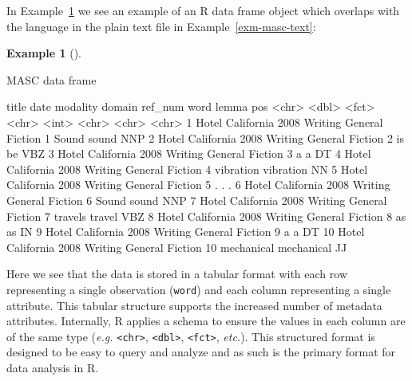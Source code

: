 \documentclass[
  letterpaper,
]{latex/krantz}
\newenvironment{Shaded}{\begin{snugshade}}{\end{snugshade}}
\newcommand{\KeywordTok}[1]{\textcolor[rgb]{0.00,0.00,0.00}{#1}}
\newcommand{\NormalTok}[1]{\textcolor[rgb]{0.00,0.00,0.00}{#1}}
\theoremstyle{definition}
\newtheorem{example}{Example}[chapter]
\theoremstyle{remark}
\begin{document}
In Example~\ref{exm-masc-df} we see an example of an R data frame object
which overlaps with the language in the plain text file in
Example~\ref{exm-masc-text}:

\begin{example}[]\protect\hypertarget{exm-masc-df}{}\label{exm-masc-df}

MASC data frame

\begin{Shaded}
\begin{Highlighting}[]
\NormalTok{   title             date modality domain          ref\_num word       lemma      pos}
\NormalTok{   \textless{}}\KeywordTok{chr}\NormalTok{\textgreater{}            \textless{}}\KeywordTok{dbl}\NormalTok{\textgreater{} \textless{}}\KeywordTok{fct}\NormalTok{\textgreater{}    \textless{}}\KeywordTok{chr}\NormalTok{\textgreater{}             \textless{}}\KeywordTok{int}\NormalTok{\textgreater{} \textless{}}\KeywordTok{chr}\NormalTok{\textgreater{}      \textless{}}\KeywordTok{chr}\NormalTok{\textgreater{}      \textless{}}\KeywordTok{chr}\NormalTok{\textgreater{}}
\NormalTok{ 1 Hotel California  2008 Writing  General Fiction       1 Sound      sound      NNP}
\NormalTok{ 2 Hotel California  2008 Writing  General Fiction       2 is         be         VBZ}
\NormalTok{ 3 Hotel California  2008 Writing  General Fiction       3 a          a          DT}
\NormalTok{ 4 Hotel California  2008 Writing  General Fiction       4 vibration  vibration  NN}
\NormalTok{ 5 Hotel California  2008 Writing  General Fiction       5 .          .          .}
\NormalTok{ 6 Hotel California  2008 Writing  General Fiction       6 Sound      sound      NNP}
\NormalTok{ 7 Hotel California  2008 Writing  General Fiction       7 travels    travel     VBZ}
\NormalTok{ 8 Hotel California  2008 Writing  General Fiction       8 as         as         IN}
\NormalTok{ 9 Hotel California  2008 Writing  General Fiction       9 a          a          DT}
\NormalTok{10 Hotel California  2008 Writing  General Fiction      10 mechanical mechanical JJ}
\end{Highlighting}
\end{Shaded}

\end{example}

Here we see that the data is stored in a tabular format with each row
representing a single observation (\texttt{word}) and each column
representing a single attribute. This tabular structure supports the
increased number of metadata attributes. Internally, R applies a schema
to ensure the values in each column are of the same type (\emph{e.g.}
\texttt{\textless{}chr\textgreater{}},
\texttt{\textless{}dbl\textgreater{}},
\texttt{\textless{}fct\textgreater{}}, \emph{etc.}). This structured
format is designed to be easy to query and analyze and as such is the
primary format for data analysis in R.
\end{document}
